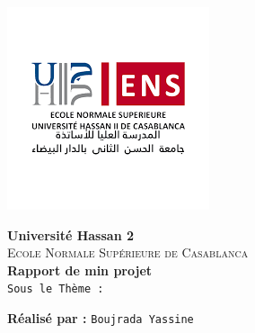 \documentclass[a4paper,12pt]{report}
\begin{document}
  
\begin{titlepage}
   \begin{sffamily}
    \begin{minipage}{0.65\textwidth}
      \begin{flushleft}
          \includegraphics[scale=0.5]{outils-images/ens logo.png}
      \end{flushleft}
          
        
      \end{minipage}
        \hspace{\fill}
    
     
    \begin{center}
     

     \vspace{1.5cm}
     \textbf{\large Université Hassan 2}\\
     \textsc{Ecole Normale Supérieure de Casablanca}\\[2.8cm]
     
     \textbf{\huge Rapport de min projet}\\[0.5cm]
     
     \texttt{Sous le Thème :} \\[0.4cm]
     

\setlength{\fboxsep}{2ex} 
\setlength {\fboxrule}{2pt}
     
    \begin{minipage}{0.5\textwidth}
      \begin{flushleft} \large
      \vspace{22mm}
       \textbf{Réalisé par :} \texttt{Boujrada Yassine}
       

\end{flushleft}
\end{minipage}
\end{center}
\end{sffamily}
\end{titlepage}
\end{document}
